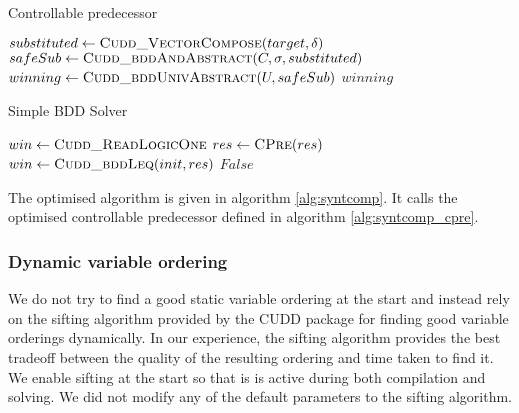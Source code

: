 \begin{algorithm}
\caption{Controllable predecessor}
\label{alg:syntcomp_cpre}

\begin{algorithmic}


    \State $substituted \gets \Call{Cudd\_VectorCompose}{target, \delta}$
    \State $safeSub     \gets \Call{Cudd\_bddAndAbstract}{C, \sigma, substituted}$
    \State $winning     \gets \Call{Cudd\_bddUnivAbstract}{U, safeSub}$
    \State \Return $winning$

\EndFunction

\end{algorithmic}
\end{algorithm}

\begin{algorithm}
\caption{Simple BDD Solver}
\label{alg:syntcomp}

\begin{algorithmic}


    \State $win \gets \Call{Cudd\_ReadLogicOne}{}$
    \Loop
        \State $res \gets \Call{CPre}{res}$
        \State $win \gets \Call{Cudd\_bddLeq}{init, res}$
            \State \Return $False$
        \EndIf
    \EndLoop

\EndFunction

\end{algorithmic}
\end{algorithm}

The optimised algorithm is given in algorithm \ref{alg:syntcomp}. It calls the optimised controllable predecessor defined in algorithm \ref{alg:syntcomp_cpre}.

\subsubsection{Dynamic variable ordering}
We do not try to find a good static variable ordering at the start and instead rely on the sifting algorithm provided by the CUDD package for finding good variable orderings dynamically. In our experience, the sifting algorithm provides the best tradeoff between the quality of the resulting ordering and time taken to find it. We enable sifting at the start so that is is active during both compilation and solving. We did not modify any of the default parameters to the sifting algorithm.

